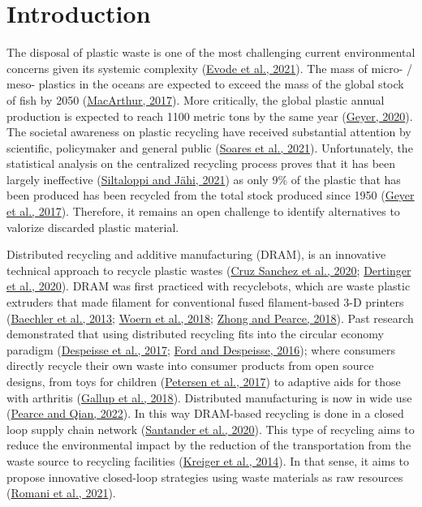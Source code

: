\documentclass[
  12pt,
]{article}
\begin{document}

\hypertarget{introduction}{%
\section{Introduction}\label{introduction}}

\linenumbers

The disposal of plastic waste is one of the most challenging current
environmental concerns given its systemic complexity
(\protect\hyperlink{ref-evode2021}{Evode et al., 2021}). The mass of
micro- / meso- plastics in the oceans are expected to exceed the mass of
the global stock of fish by 2050
(\protect\hyperlink{ref-macarthur2017}{MacArthur, 2017}). More
critically, the global plastic annual production is expected to reach
1100 metric tons by the same year
(\protect\hyperlink{ref-geyer2020}{Geyer, 2020}). The societal awareness
on plastic recycling have received substantial attention by scientific,
policymaker and general public
(\protect\hyperlink{ref-soares2021}{Soares et al., 2021}).
Unfortunately, the statistical analysis on the centralized recycling
process proves that it has been largely ineffective
(\protect\hyperlink{ref-Siltaloppi2021}{Siltaloppi and Jähi, 2021}) as
only 9\% of the plastic that has been produced has been recycled from
the total stock produced since 1950
(\protect\hyperlink{ref-Geyer2017}{Geyer et al., 2017}). Therefore, it
remains an open challenge to identify alternatives to valorize discarded
plastic material.

Distributed recycling and additive manufacturing (DRAM), is an
innovative technical approach to recycle plastic wastes
(\protect\hyperlink{ref-cruzsanchez2020}{Cruz Sanchez et al., 2020};
\protect\hyperlink{ref-dertinger2020}{Dertinger et al., 2020}). DRAM was
first practiced with recyclebots, which are waste plastic extruders that
made filament for conventional fused filament-based 3-D printers
(\protect\hyperlink{ref-baechler2013}{Baechler et al., 2013};
\protect\hyperlink{ref-woern2018}{Woern et al., 2018};
\protect\hyperlink{ref-zhong2018}{Zhong and Pearce, 2018}). Past
research demonstrated that using distributed recycling fits into the
circular economy paradigm
(\protect\hyperlink{ref-Despeisse2016}{Despeisse et al., 2017};
\protect\hyperlink{ref-Ford2016}{Ford and Despeisse, 2016}); where
consumers directly recycle their own waste into consumer products from
open source designs, from toys for children
(\protect\hyperlink{ref-Petersen2017}{Petersen et al., 2017}) to
adaptive aids for those with arthritis
(\protect\hyperlink{ref-gallup2018}{Gallup et al., 2018}). Distributed
manufacturing is now in wide use
(\protect\hyperlink{ref-pearce2022}{Pearce and Qian, 2022}). In this way
DRAM-based recycling is done in a closed loop supply chain network
(\protect\hyperlink{ref-santander2020}{Santander et al., 2020}). This
type of recycling aims to reduce the environmental impact by the
reduction of the transportation from the waste source to recycling
facilities (\protect\hyperlink{ref-kreiger2014}{Kreiger et al., 2014}).
In that sense, it aims to propose innovative closed-loop strategies
using waste materials as raw resources
(\protect\hyperlink{ref-romani2021}{Romani et al., 2021}).
\end{document}
